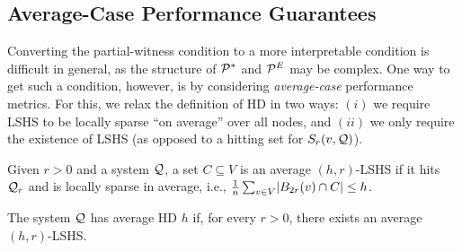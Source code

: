\documentclass[opre,nonblindrev]{informs3} %
\begin{document}
\subsection{Average-Case Performance Guarantees}
\label{sec:avg_hd}
Converting the partial-witness condition to a more interpretable condition is difficult in general, as the structure of $\mathcal{P}^*$ and $\mathcal{P}^E$ may be complex. 
One way to get such a condition, however, is by considering \emph{average-case} performance metrics.
For this, we relax the definition of HD in two ways: $(i)$ we require LSHS to be locally sparse ``on average'' over all nodes, and
$(ii)$ we only require the existence of LSHS (as opposed to a hitting set for $S_r(v,\mathcal{Q})$).

\begin{definition}
Given $r>0$ and a system $\mathcal{Q}$, a set $C\subseteq V$ is an average $(h,r)$-LSHS if it hits $\mathcal{Q}_r$ and is locally sparse in average, i.e.,
$\frac{1}{n}\sum_{v\in V} \lvert B_{2r}(v)\cap C\rvert \leq h$.
\end{definition}
\begin{definition}[Average HD]
The system $\mathcal{Q}$ has average HD $h$ if, for every $r>0$, there exists an average $(h,r)$-LSHS.
\end{definition}
\end{document}
